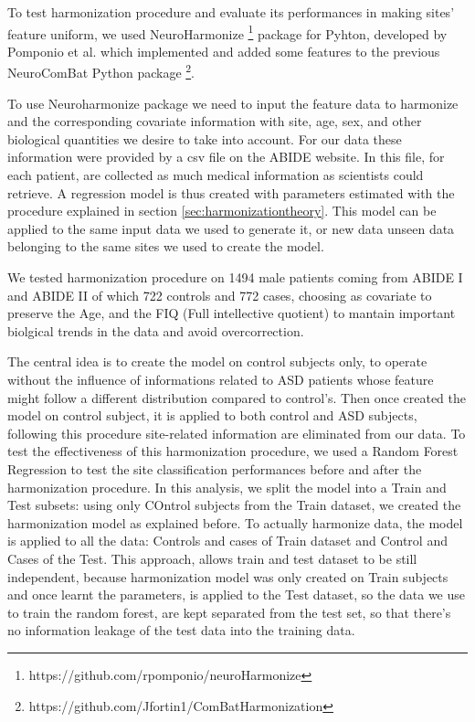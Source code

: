 \documentclass[10pt]{report}
\begin{document}
To test harmonization procedure and evaluate its performances in making sites' feature uniform, we used NeuroHarmonize \footnote{https://github.com/rpomponio/neuroHarmonize} package for Pyhton, developed by Pomponio et al. \cite{pomponio-2019} which implemented and added some features to the previous NeuroComBat Python package \footnote{https://github.com/Jfortin1/ComBatHarmonization}.

To use Neuroharmonize package we need to input the feature data to harmonize and the corresponding covariate information with site, age, sex, and other biological quantities we desire to take into account.
For our data these information were provided by a csv file on the ABIDE website. In this file, for each patient, are collected as much medical information as scientists could retrieve.
A regression model is thus created with parameters estimated with the procedure explained in section \ref{sec:harmonizationtheory}. This model can be applied to the same input data we used to generate it, or new data unseen data belonging to the same sites we used to create the model.

We tested harmonization procedure on 1494 male patients coming from ABIDE I and ABIDE II of which 722 controls and 772 cases, choosing as covariate to preserve the Age, and the FIQ (Full intellective quotient) to mantain important biolgical trends in the data and avoid overcorrection.


The central idea is to create the model on control subjects only, to operate without the influence of informations related to ASD patients whose feature might follow a different distribution compared to control's.
Then once created the model on control subject, it is applied to both control and ASD subjects, following this procedure site-related information are eliminated from our data.
To test the effectiveness of this harmonization procedure, we used a Random Forest Regression to test the site classification performances before and after the harmonization procedure.
In this analysis, we split the model into a Train and Test subsets: using only COntrol subjects from the Train dataset, we created the harmonization model as explained before.
To actually harmonize data, the model is applied to all the data: Controls and cases of Train dataset and Control and Cases of the Test.
This approach, allows train and test dataset to be still independent, because harmonization model was only created on Train subjects and once learnt the parameters, is applied to the Test dataset, so the data we use to train the random forest, are kept separated from the test set, so that there's no information leakage of the test data into the training data.
\end{document}
